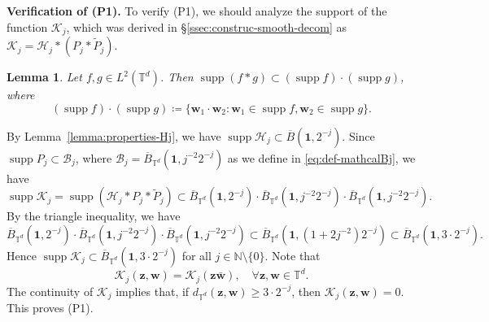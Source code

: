 \documentclass[12pt]{amsart}
\newtheorem{lemma}[theorem]{Lemma}
\theoremstyle{definition}
\theoremstyle{remark}
\newcommand{\bz}{\boldsymbol{z}}
\newcommand{\bw}{\boldsymbol{w}}
\newcommand{\N}{\mathbb{N}}
\newcommand{\T}{\mathbb{T}}
\newcommand{\supp}{\operatorname{supp}}
\numberwithin{equation}{section}
\begin{document}
\medskip
{\flushleft \bf Verification of (P1).}
To verify (P1), we should analyze the support of the function $\mathcal{K}_j$, which was derived in \S\ref{ssec:construc-smooth-decom} as $\mathcal{K}_{j}=\mathcal{H}_{j}*(P_{j}*\widetilde{P}_{j})$.

\begin{lemma}
Let $f,g\in L^2(\T^d)$. Then $\supp(f*g)\subset (\supp f)\cdot (\supp g)$, where
\[
(\supp f)\cdot (\supp g)\coloneq \{\bw_1\cdot \bw_2:\bw_1\in \supp f,\bw_2\in \supp g\}.
\]
\end{lemma}

By Lemma~\ref{lemma:properties-Hj}, we have $\supp \mathcal{H}_j\subset \overline{B}(\boldsymbol{1},2^{-j})$. Since $\supp P_j\subset \mathcal{B}_j$, where $\mathcal{B}_j=\overline{B}_{\T^d}(\boldsymbol{1},j^{-2}2^{-j})$ as we define in \eqref{eq:def-mathcalBj}, we have
\[
\supp \mathcal{K}_j=\supp (\mathcal{H}_j*P_j*\widetilde{P}_j)\subset \overline{B}_{\T^d}(\boldsymbol{1},2^{-j})\cdot \overline{B}_{\T^d}(\boldsymbol{1},j^{-2}2^{-j})\cdot \overline{B}_{\T^d}(\boldsymbol{1},j^{-2}2^{-j}).
\]
By the triangle inequality, we have
\[
\overline{B}_{\T^d}(\boldsymbol{1},2^{-j})\cdot \overline{B}_{\T^d}(\boldsymbol{1},j^{-2}2^{-j})\cdot \overline{B}_{\T^d}(\boldsymbol{1},j^{-2}2^{-j})\subset \overline{B}_{\T^d}(\boldsymbol{1},(1+2j^{-2})2^{-j})\subset \overline{B}_{\T^d}(\boldsymbol{1},3\cdot 2^{-j}).
\]
Hence $\supp \mathcal{K}_j\subset \overline{B}_{\T^d}(\boldsymbol{1},3\cdot2^{-j})$ for all $j\in \N\setminus\{0\}$. Note that
\[
\mathcal{K}_j(\bz,\bw)=\mathcal{K}_j(\bz\bar{\bw}),\quad \forall \bz,\bw\in \T^d.
\]
The continuity of $\mathcal{K}_j$ implies that, if $d_{\T^d}(\bz,\bw)\ge 3\cdot2^{-j}$, then $\mathcal{K}_j(\bz,\bw)=0$. This proves (P1).
\end{document}

